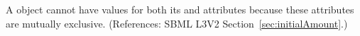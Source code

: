 A \Species object cannot have values for both its
 and  attributes because
these attributes are mutually exclusive.  (References: SBML L3V2
Section~\ref{sec:initialAmount}.)
